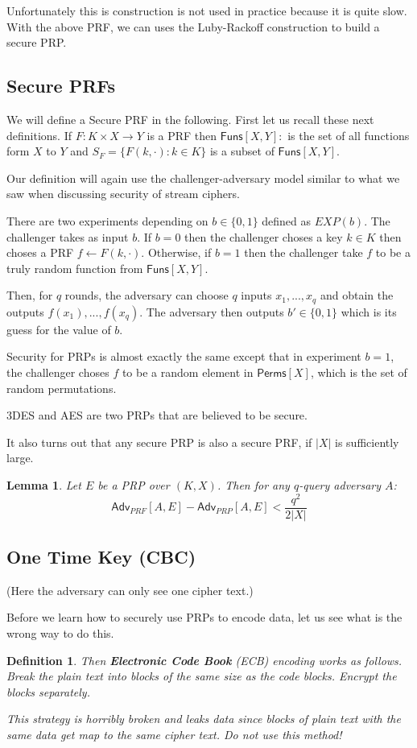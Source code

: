 \documentclass[twoside]{article}
\newtheorem{lemma}[theorem]{Lemma}
\newtheorem{definition}[theorem]{Definition}
\def\Funs{\mathsf{Funs}}
\def\Perms{\mathsf{Perms}}
\def\Adv{\mathsf{Adv}}
\begin{document}
Unfortunately this is construction is not used in practice because it is quite slow. With the above PRF, we can uses the Luby-Rackoff construction to build a secure PRP.

\subsection{Secure PRFs}
We will define a Secure PRF in the following. First let us recall these next definitions. If $F: K \times X \rightarrow Y$ is a PRF then $\Funs[X,Y]:$ is the set of all functions form $X$ to $Y$ and $S_{F} = \{F(k, \cdot): k \in K\}$ is a subset of $\Funs[X, Y]$.

Our definition will again use the challenger-adversary model similar to what we saw when discussing security of stream ciphers.

There are two experiments depending on $b \in \{0,1\}$ defined as $EXP(b)$. The challenger takes as input $b$. If $b = 0$ then the challenger choses a key $k \in K$ then choses a PRF $f \leftarrow F(k, \cdot)$. Otherwise, if $b = 1$ then the challenger take $f$ to be a truly random function from $\Funs[X,Y]$.

Then, for $q$ rounds, the adversary can choose $q$ inputs $x_1, ..., x_q$ and obtain the outputs $f(x_1), ..., f(x_q)$. The adversary then outputs $b' \in \{0,1\}$ which is its guess for the value of $b$.

Security for PRPs is almost exactly the same except that in experiment $b = 1$, the challenger choses $f$ to be a random element in $\Perms[X]$, which is the set of random permutations.

3DES and AES are two PRPs that are believed to be secure.

It also turns out that any secure PRP is also a secure PRF, if $|X|$ is sufficiently large.
\begin{lemma}
Let $E$ be a PRP over $(K, X)$. Then for any $q$-query adversary $A$: 
\[\Adv_{PRF}[A,E] - \Adv_{PRP}[A,E] < \frac{q^2}{2|X|}\]
\end{lemma}

\subsection{One Time Key (CBC)}
(Here the adversary can only see one cipher text.)

Before we learn how to securely use PRPs to encode data, let us see what is the wrong way to do this. 

\begin{definition}
Then \textbf{Electronic Code Book} (ECB) encoding works as follows. Break the plain text into blocks of the same size as the code blocks. Encrypt the blocks separately.

This strategy is horribly broken and leaks data since blocks of plain text with the same data get map to the same cipher text. \emph{Do not use this method!}
\end{definition}
\end{document}
